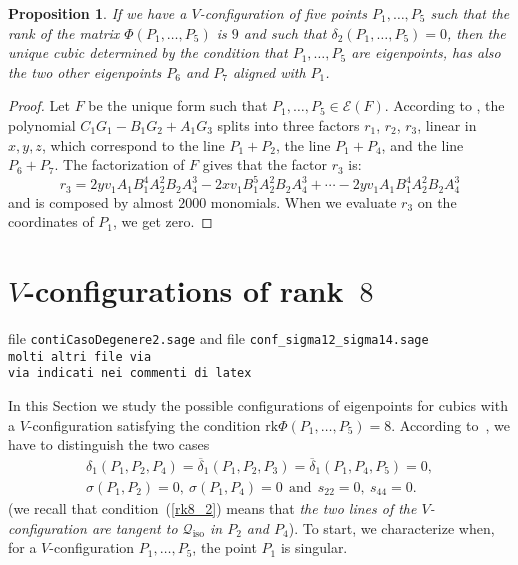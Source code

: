 \documentclass{amsart}
\theoremstyle{plain}
\newtheorem{prop}[lemma]{Proposition}
\theoremstyle{definition}
\newcommand{\iso}{\mathcal{Q}_{\mathrm{iso}}}
\newcommand{\Eig}[1]{\mathcal{E}\!\left( {#1} \right)}
\newcommand{\rk}{\ensuremath{\mathrm{rk}}}
\begin{document}
%
\begin{prop}
\label{proposition:terzo_allineamento}
If we have a $V$-configuration of five points $P_1, \dots, P_5$
such that the rank of the matrix $\Phi(P_1, \dots, P_5)$ is $9$ and
such that $\delta_2(P_1, \dots, P_5) = 0$,
then the unique cubic determined by the condition that $P_1, \dots, P_5$
are eigenpoints, has also the two other eigenpoints $P_6$ and $P_7$
aligned with $P_1$.
\end{prop}
\begin{proof}
Let $F$ be the unique form such that $P_1, \dotsc, P_5 \in \Eig{F}$.
According to , the polynomial
$C_1G_1-B_1G_2+A_1G_3$ splits into three factors $r_1$, $r_2$, $r_3$,
linear in $x, y, z$, which
correspond to the line $P_1+P_2$, the line $P_1+P_4$, and the line $P_6+P_7$.
The factorization of $F$ gives that the factor $r_3$ is:
\[
r_3 = 2yv_1A_1B_1^4A_2^2B_2A_4^3-2xv_1B_1^5A_2^2B_2A_4^3+\cdots
-2 yv_1A_1B_1^4A_2^2B_2A_4^3
\]
and is composed by almost $2000$ monomials. When we
evaluate $r_3$ on the coordinates of $P_1$, we get zero.
\end{proof}

\section{$V$-configurations of rank~$8$}
\label{rank_8}
file \verb+contiCasoDegenere2.sage+ and file
\verb+conf_sigma12_sigma14.sage+\\
\verb+molti altri file via +\\
\verb+via indicati nei commenti di latex+

In this Section we study the possible configurations of
eigenpoints for cubics with a $V$-configuration
satisfying the condition $\rk \Phi(P_1, \dots, P_5) = 8$. According
to~, we have to distinguish the two cases
\begin{eqnarray}
\delta_1(P_1, P_2, P_4)=\overline{\delta}_1(P_1, P_2, P_3) =
\overline{\delta}_1(P_1, P_4, P_5) = 0,
\label{rk8_1}\\
\sigma(P_1, P_2) = 0, \  \sigma(P_1, P_4) = 0 \ \ \mbox{and} \ \ s_{22} = 0,
\  s_{44} = 0.
\label{rk8_2}
\end{eqnarray}
(we recall that condition~(\ref{rk8_2}) means that \emph{the two lines of
the $V$-configuration are tangent to $\iso$ in $P_2$ and $P_4$}).
%
To start, we characterize when, for a $V$-configuration
$P_1, \dotsc, P_5$, the point $P_1$ is singular.
\end{document}
